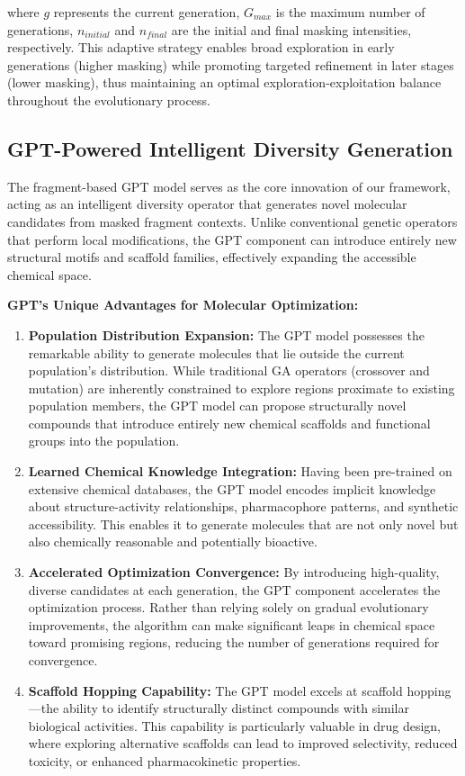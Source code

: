 \documentclass[lettersize,journal]{IEEEtran}
\begin{document}
where $g$ represents the current generation, $G_{max}$ is the maximum number of generations, $n_{initial}$ and $n_{final}$ are the initial and final masking intensities, respectively. This adaptive strategy enables broad exploration in early generations (higher masking) while promoting targeted refinement in later stages (lower masking), thus maintaining an optimal exploration-exploitation balance throughout the evolutionary process.

\subsection{GPT-Powered Intelligent Diversity Generation}

The fragment-based GPT model serves as the core innovation of our framework, acting as an intelligent diversity operator that generates novel molecular candidates from masked fragment contexts. Unlike conventional genetic operators that perform local modifications, the GPT component can introduce entirely new structural motifs and scaffold families, effectively expanding the accessible chemical space.

\noindent \textbf{GPT's Unique Advantages for Molecular Optimization:}

\begin{enumerate}
\item \textbf{Population Distribution Expansion:} The GPT model possesses the remarkable ability to generate molecules that lie outside the current population's distribution. While traditional GA operators (crossover and mutation) are inherently constrained to explore regions proximate to existing population members, the GPT model can propose structurally novel compounds that introduce entirely new chemical scaffolds and functional groups into the population.

\item \textbf{Learned Chemical Knowledge Integration:} Having been pre-trained on extensive chemical databases, the GPT model encodes implicit knowledge about structure-activity relationships, pharmacophore patterns, and synthetic accessibility. This enables it to generate molecules that are not only novel but also chemically reasonable and potentially bioactive.

\item \textbf{Accelerated Optimization Convergence:} By introducing high-quality, diverse candidates at each generation, the GPT component accelerates the optimization process. Rather than relying solely on gradual evolutionary improvements, the algorithm can make significant leaps in chemical space toward promising regions, reducing the number of generations required for convergence.

\item \textbf{Scaffold Hopping Capability:} The GPT model excels at scaffold hopping—the ability to identify structurally distinct compounds with similar biological activities. This capability is particularly valuable in drug design, where exploring alternative scaffolds can lead to improved selectivity, reduced toxicity, or enhanced pharmacokinetic properties.
\end{enumerate}
\end{document}
